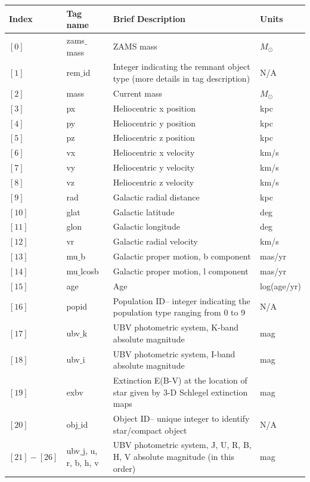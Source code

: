 \documentclass{scrartcl}
\begin{document}
\begin{table}[h]
\centering
{}
\begin{tabular}{ l | l | p{6.5cm} | l }
    \textbf{Index} & \textbf{Tag name} & \textbf{Brief Description} & \textbf{Units} \\ 
    \hline
    $[0]$ & zams$\_$mass & ZAMS mass & $M_\odot$ \\ 
    $[1]$ & rem$\_$id & Integer indicating the remnant object type (more details in tag description) & N/A \\
    $[2]$ & mass & Current mass & $M_\odot$ \\
    $[3]$ & px & Heliocentric x position & kpc \\
    $[4]$ & py & Heliocentric y position & kpc \\
    $[5]$ & pz & Heliocentric z position & kpc \\
    $[6]$ & vx & Heliocentric x velocity & km/s \\
    $[7]$ & vy & Heliocentric y velocity & km/s \\
    $[8]$ & vz & Heliocentric z velocity & km/s \\
    $[9]$ & rad & Galactic radial distance & kpc \\
    $[10]$ & glat & Galactic latitude & deg \\
    $[11]$ & glon & Galactic longitude & deg \\
    $[12]$ & vr & Galactic radial velocity & km/s \\
    $[13]$ & mu$\_$b & Galactic proper motion, b component  & mas/yr \\
    $[14]$ & mu$\_$lcosb & Galactic proper motion, l component & mas/yr \\
    $[15]$ & age & Age & log(age/yr) \\
    $[16]$ & popid & Population ID-- integer indicating the population type ranging from 0 to 9 & N/A \\
    $[17]$ & ubv$\_$k & UBV photometric system, K-band absolute magnitude & mag \\
    $[18]$ & ubv$\_$i & UBV photometric system, I-band absolute magnitude & mag \\
    $[19]$ & exbv & Extinction E(B-V) at the location of star given by 3-D Schlegel extinction maps & mag \\
    $[20]$ & obj$\_$id & Object ID-- unique integer to identify star/compact object & N/A \\
    $[21] - [26]$ & ubv$\_$j, u, r, b, h, v & UBV photometric system, J, U, R, B, H, V absolute magnitude (in this order) & mag \\

\end{tabular}
\end{table}
\end{document}
